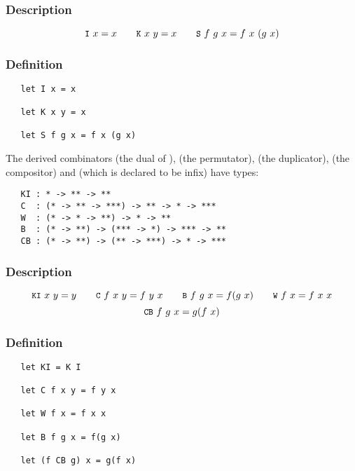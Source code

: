 \subsubsection*{Description}

\[ \ml{I}\ x = x\qquad \ml{K}\ x\ y = x\qquad \ml{S}\ f\ g\ x = f\ x\ (g\ x) \]

\subsubsection*{Definition}

\begin{hol}\begin{verbatim}
   let I x = x

   let K x y = x

   let S f g x = f x (g x)
\end{verbatim}\end{hol}


\noindent The derived combinators  (the dual of ),  (the
permutator),  (the duplicator),  (the compositor) and 
(which is declared to be infix) have types:

\begin{boxed}

\begin{verbatim}
   KI : * -> ** -> **
   C  : (* -> ** -> ***) -> ** -> * -> ***
   W  : (* -> * -> **) -> * -> **
   B  : (* -> **) -> (*** -> *) -> *** -> **
   CB : (* -> **) -> (** -> ***) -> * -> ***
\end{verbatim}\end{boxed}

\subsubsection*{Description}

\[ \ml{KI}\ x\ y = y\qquad
\ml{C}\ f\ x\ y = f\ y\ x\qquad
\ml{B}\ f\ g\ x = f(g\ x)\qquad
\ml{W}\ f\ x = f\ x\ x \]
\[ \ml{CB}\ f\ g\ x = g(f\ x) \]

\subsubsection*{Definition}

\begin{hol}\begin{verbatim}
   let KI = K I

   let C f x y = f y x

   let W f x = f x x

   let B f g x = f(g x)

   let (f CB g) x = g(f x)
\end{verbatim}\end{hol}


